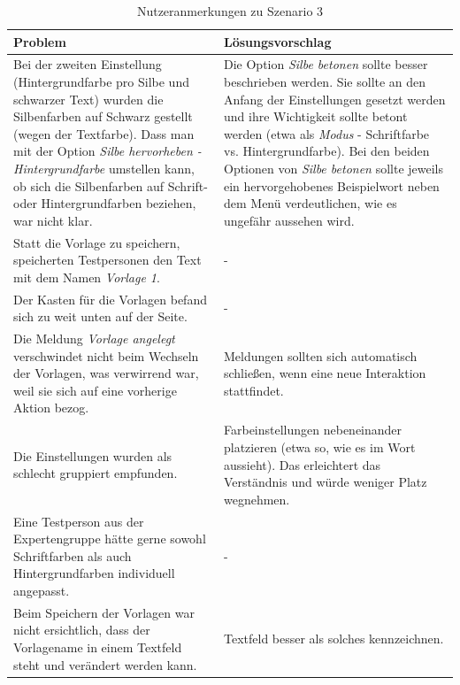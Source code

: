 \begin{table}[h!]
	\centering
	\begin{tabular}{|p{}|p{}|}
		\hline
		\textbf{Problem} & \textbf{Lösungsvorschlag}\\
		\hline
		\hline
		Bei der zweiten Einstellung (Hintergrundfarbe pro Silbe und schwarzer Text) wurden die Silbenfarben auf Schwarz gestellt (wegen der Textfarbe). Dass man mit der Option \textit{Silbe hervorheben - Hintergrundfarbe} umstellen kann, ob sich die Silbenfarben auf Schrift- oder Hintergrundfarben beziehen, war nicht klar. & Die Option \textit{Silbe betonen} sollte besser beschrieben werden. Sie sollte an den Anfang der Einstellungen gesetzt werden und ihre Wichtigkeit sollte betont werden (etwa als \textit{Modus} - Schriftfarbe vs. Hintergrundfarbe). Bei den beiden Optionen von \textit{Silbe betonen} sollte jeweils ein hervorgehobenes Beispielwort neben dem Menü verdeutlichen, wie es ungefähr aussehen wird.\\
		\hline
		Statt die Vorlage zu speichern, speicherten Testpersonen den Text mit dem Namen \textit{Vorlage 1}. & -\\
		\hline
		Der Kasten für die Vorlagen befand sich zu weit unten auf der Seite. & -\\
		\hline
		Die Meldung \textit{Vorlage angelegt} verschwindet nicht beim Wechseln der Vorlagen, was verwirrend war, weil sie sich auf eine vorherige Aktion bezog. & Meldungen sollten sich automatisch schließen, wenn eine neue Interaktion stattfindet.\\
		\hline
		Die Einstellungen wurden als schlecht gruppiert empfunden.  & Farbeinstellungen nebeneinander platzieren (etwa so, wie es im Wort aussieht). Das erleichtert das Verständnis und würde weniger Platz wegnehmen.\\
		\hline
		Eine Testperson aus der Expertengruppe hätte gerne sowohl Schriftfarben als auch Hintergrundfarben individuell angepasst. & -\\
		\hline
		Beim Speichern der Vorlagen war nicht ersichtlich, dass der Vorlagename in einem Textfeld steht und verändert werden kann. & Textfeld besser als solches kennzeichnen.\\
		\hline
	\end{tabular}
	\caption{Nutzeranmerkungen zu Szenario 3}
	\label{table:szenario3}
\end{table}
\newpage

